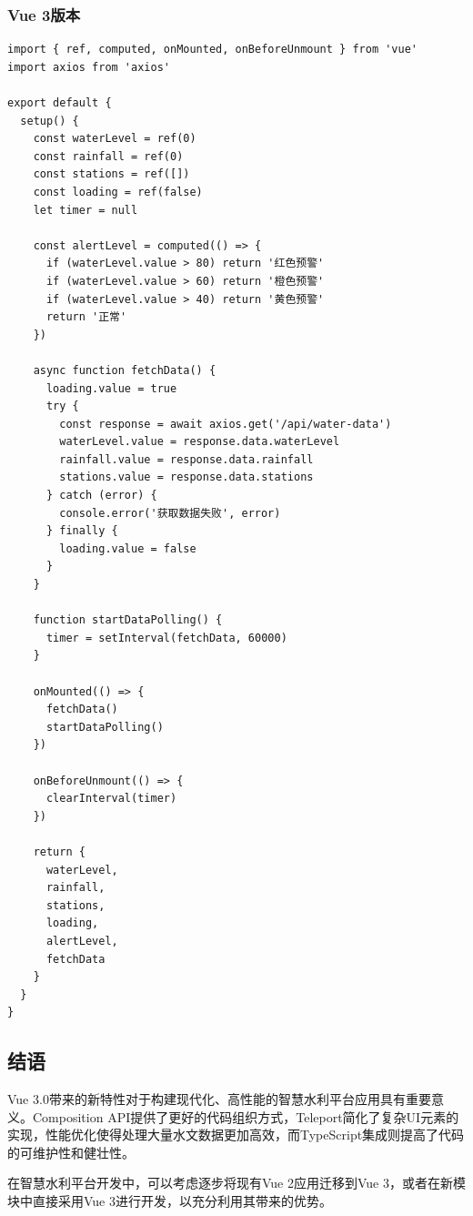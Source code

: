 \subsubsection{Vue 3版本}\label{vue-3ux7248ux672c}

\begin{lstlisting}
import { ref, computed, onMounted, onBeforeUnmount } from 'vue'
import axios from 'axios'

export default {
  setup() {
    const waterLevel = ref(0)
    const rainfall = ref(0)
    const stations = ref([])
    const loading = ref(false)
    let timer = null
    
    const alertLevel = computed(() => {
      if (waterLevel.value > 80) return '红色预警'
      if (waterLevel.value > 60) return '橙色预警'
      if (waterLevel.value > 40) return '黄色预警'
      return '正常'
    })
    
    async function fetchData() {
      loading.value = true
      try {
        const response = await axios.get('/api/water-data')
        waterLevel.value = response.data.waterLevel
        rainfall.value = response.data.rainfall
        stations.value = response.data.stations
      } catch (error) {
        console.error('获取数据失败', error)
      } finally {
        loading.value = false
      }
    }
    
    function startDataPolling() {
      timer = setInterval(fetchData, 60000)
    }
    
    onMounted(() => {
      fetchData()
      startDataPolling()
    })
    
    onBeforeUnmount(() => {
      clearInterval(timer)
    })
    
    return {
      waterLevel,
      rainfall,
      stations,
      loading,
      alertLevel,
      fetchData
    }
  }
}
\end{lstlisting}

\subsection{结语}\label{ux7ed3ux8bed}

Vue
3.0带来的新特性对于构建现代化、高性能的智慧水利平台应用具有重要意义。Composition
API提供了更好的代码组织方式，Teleport简化了复杂UI元素的实现，性能优化使得处理大量水文数据更加高效，而TypeScript集成则提高了代码的可维护性和健壮性。

在智慧水利平台开发中，可以考虑逐步将现有Vue 2应用迁移到Vue
3，或者在新模块中直接采用Vue 3进行开发，以充分利用其带来的优势。
